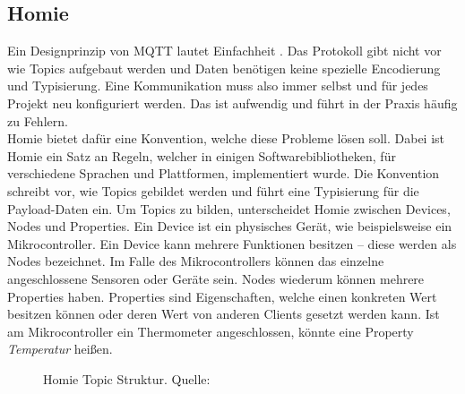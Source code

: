 \subsection{Homie}
\label{subs:homie}

Ein Designprinzip von MQTT lautet Einfachheit \cite{mqtt-design-principles}. 
Das Protokoll gibt nicht vor wie Topics aufgebaut werden und Daten benötigen keine spezielle
Encodierung und Typisierung. Eine Kommunikation muss also immer selbst und
für jedes Projekt neu konfiguriert werden. Das ist aufwendig und führt in der 
Praxis häufig zu Fehlern.\\

Homie \cite{homie} bietet dafür eine Konvention, welche diese Probleme lösen soll. Dabei ist Homie
ein Satz an Regeln, welcher in einigen Softwarebibliotheken, für verschiedene
Sprachen und Plattformen, implementiert wurde. Die Konvention schreibt vor, wie Topics 
gebildet werden und führt eine Typisierung für die Payload-Daten ein.
Um Topics zu bilden, unterscheidet Homie zwischen Devices, Nodes und Properties. Ein Device
ist ein physisches Gerät, wie beispielsweise ein Mikrocontroller.
Ein Device kann mehrere Funktionen besitzen -- diese werden als Nodes
bezeichnet. Im Falle des Mikrocontrollers können das einzelne angeschlossene Sensoren
oder Geräte sein. Nodes wiederum können mehrere Properties haben. Properties sind Eigenschaften, welche 
einen konkreten Wert besitzen können oder deren Wert von anderen Clients gesetzt werden kann.
Ist am Mikrocontroller ein Thermometer angeschlossen, könnte eine Property \emph{Temperatur} heißen.

\begin{figure}
  
  \caption{Homie Topic Struktur. Quelle: \cite{homie}}
  \label{fig:homie-example}
\end{figure}

